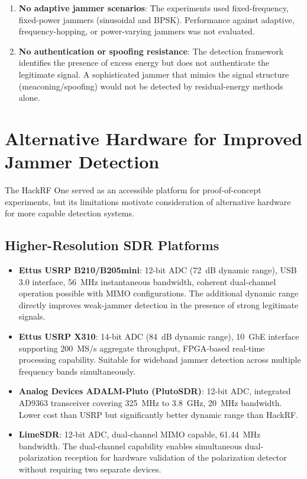 \documentclass{article}
\begin{document}
\begin{enumerate}
\item \textbf{No adaptive jammer scenarios}: The experiments used fixed-frequency, fixed-power jammers (sinusoidal and BPSK). Performance against adaptive, frequency-hopping, or power-varying jammers was not evaluated.

\item \textbf{No authentication or spoofing resistance}: The detection framework identifies the presence of excess energy but does not authenticate the legitimate signal. A sophisticated jammer that mimics the signal structure (meaconing/spoofing) would not be detected by residual-energy methods alone.
\end{enumerate}


\newpage
\section{Alternative Hardware for Improved Jammer Detection}
\label{sec:alt_hardware}

The HackRF One served as an accessible platform for proof-of-concept experiments, but its limitations motivate consideration of alternative hardware for more capable detection systems.

\subsection{Higher-Resolution SDR Platforms}

\begin{itemize}
\item \textbf{Ettus USRP B210/B205mini}: 12-bit ADC (72~dB dynamic range), USB 3.0 interface, 56~MHz instantaneous bandwidth, coherent dual-channel operation possible with MIMO configurations. The additional dynamic range directly improves weak-jammer detection in the presence of strong legitimate signals.

\item \textbf{Ettus USRP X310}: 14-bit ADC (84~dB dynamic range), 10~GbE interface supporting 200~MS/s aggregate throughput, FPGA-based real-time processing capability. Suitable for wideband jammer detection across multiple frequency bands simultaneously.

\item \textbf{Analog Devices ADALM-Pluto (PlutoSDR)}: 12-bit ADC, integrated AD9363 transceiver covering 325~MHz to 3.8~GHz, 20~MHz bandwidth. Lower cost than USRP but significantly better dynamic range than HackRF.

\item \textbf{LimeSDR}: 12-bit ADC, dual-channel MIMO capable, 61.44~MHz bandwidth. The dual-channel capability enables simultaneous dual-polarization reception for hardware validation of the polarization detector without requiring two separate devices.
\end{itemize}
\end{document}
